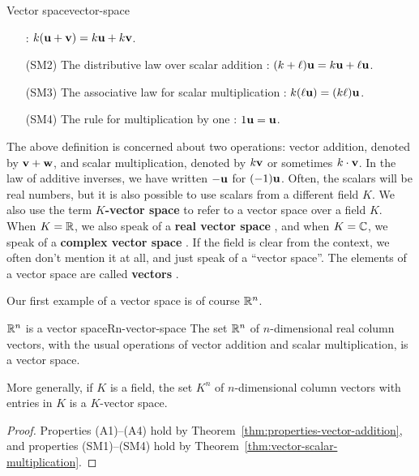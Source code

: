 \begin{definition}{Vector space}{vector-space}
\begin{itemize}
    :
    $k(\mbox{\bf u} + \mbox{\bf v}) = k\mbox{\bf u} + k\mbox{\bf v}$.
  \item[(SM2)] The distributive law over scalar addition%
    :
    $(k + \ell) \mbox{\bf u} = k \mbox{\bf u} + \ell\mbox{\bf u}$.
  \item[(SM3)] The associative law for scalar multiplication%
    :
    $k(\ell\mbox{\bf u}) = (k \ell)\mbox{\bf u}$.
  \item[(SM4)] The rule for multiplication by one%
    :
    $1\mbox{\bf u}=\mbox{\bf u}$.
  \end{itemize}
\end{definition}

The above definition is concerned about two operations: vector
addition, denoted by $\mbox{\bf v} + \mbox{\bf w}$, and scalar multiplication,
denoted by $k\mbox{\bf v}$ or sometimes $k\cdot\mbox{\bf v}$. In the law of
additive inverses, we have written $-\mbox{\bf u}$ for $(-1)\mbox{\bf u}$.
Often, the scalars will be real numbers, but it is also possible to
use scalars from a different field $K$. We also use the term
\textbf{$K$-vector space}%
 to refer to a vector space
over a field $K$.  When $K=\mathbb{R}$, we also speak of a \textbf{real vector
  space}%
%
, and when $K=\mathbb{C}$, we speak of a
\textbf{complex vector space}%
%
. If the field is clear from the context,
we often don't mention it at all, and just speak of a ``vector
space''. The elements of a vector space are called \textbf{vectors}%
.

Our first example of a vector space is of course $\mathbb{R}^n$.

\begin{example}{$\mathbb{R}^n$ is a vector space}{Rn-vector-space}
  The set $\mathbb{R}^n$ of $n$-dimensional real column vectors, with the
  usual operations of vector addition and scalar multiplication, is a
  vector space.

  More generally, if $K$ is a field, the set $K^n$ of $n$-dimensional
  column vectors with entries in $K$ is a $K$-vector space.
\end{example}

\begin{proof}
  Properties (A1)--(A4) hold by
  Theorem~\ref{thm:properties-vector-addition}, and properties
  (SM1)--(SM4) hold by Theorem~\ref{thm:vector-scalar-multiplication}.
\end{proof}

